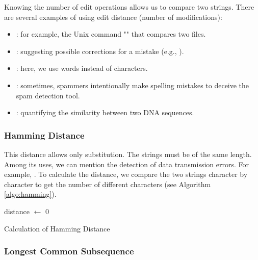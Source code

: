 \documentclass{KBook}
\begin{document}
Knowing the number of edit operations allows us to compare two strings. There are several examples of using edit distance (number of modifications):
\begin{itemize}
	\item {}: for example, the Unix command "" that compares two files.
	\item {}: suggesting possible corrections for a mistake (e.g., ).
	\item {}: here, we use words instead of characters.
	\item {}: sometimes, spammers intentionally make spelling mistakes to deceive the spam detection tool.
	\item {}: quantifying the similarity between two DNA sequences.
\end{itemize}

\subsubsection{Hamming Distance}

This distance allows only substitution. The strings must be of the same length. Among its uses, we can mention the detection of data transmission errors.\newline
For example, .
To calculate the distance, we compare the two strings character by character to get the number of different characters (see Algorithm \ref{algo:hamming}).

\begin{algorithm}[ht]
	distance $\leftarrow$ 0\;
	
	
	\caption{Calculation of Hamming Distance \label{algo:hamming}}
	
\end{algorithm}



\subsubsection{Longest Common Subsequence}
\end{document}
